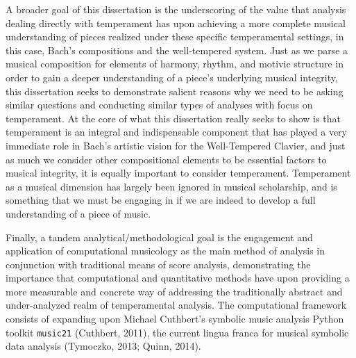 A broader goal of this dissertation is the underscoring of the value
that analysis dealing directly with temperament has upon achieving a
more complete musical understanding of pieces realized under these
specific temperamental settings, in this case, Bach's compositions and
the well-tempered system. Just as we parse a musical composition for
elements of harmony, rhythm, and motivic structure in order to gain a
deeper understanding of a piece's underlying musical integrity, this
dissertation seeks to demonstrate salient reasons why we need to be
asking similar questions and conducting similar types of analyses with
focus on temperament. At the core of what this dissertation really seeks
to show is that temperament is an integral and indispensable component
that has played a very immediate role in Bach's artistic vision for the
Well-Tempered Clavier, and just as much we consider other compositional
elements to be essential factors to musical integrity, it is equally
important to consider temperament. Temperament as a musical dimension
has largely been ignored in musical scholarship, and is something that
we must be engaging in if we are indeed to develop a full understanding
of a piece of music.

Finally, a tandem analytical/methodological goal is the engagement and
application of computational musicology as the main method of analysis
in conjunction with traditional means of score analysis, demonstrating
the importance that computational and quantitative methods have upon
providing a more measurable and concrete way of addressing the
traditionally abstract and under-analyzed realm of temperamental
analysis. The computational framework consists of expanding upon Michael
Cuthbert's symbolic music analysis Python toolkit \texttt{music21}
(Cuthbert, 2011), the current lingua franca for musical symbolic data
analysis (Tymoczko, 2013; Quinn, 2014).

